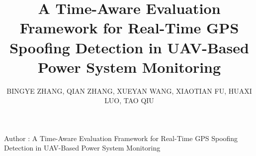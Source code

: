 \documentclass{ieeeaccess}
\begin{document}

\title{A Time-Aware Evaluation Framework for Real-Time GPS Spoofing Detection in UAV-Based Power System Monitoring}
\author{\uppercase{Bingye Zhang},
\uppercase{Qian Zhang},
\uppercase{Xueyan Wang},
\uppercase{Xiaotian Fu},
\uppercase{Huaxi Luo},
\uppercase{Tao Qiu}}

\address[1]{State Grid Taizhou Power Supply Company, No. 809, Zhongxing Road, Jiaojiang District, Taizhou 318000, China}
\address[2]{Ningbo Induschain Digital Technology Co., Ltd., No. 161 Yongshuiqiao Road, Building 2, 18–19F, Haishu District, Ningbo 315000, China}


{Author \headeretal: A Time-Aware Evaluation Framework for Real-Time GPS Spoofing Detection in UAV-Based Power System Monitoring}

\end{document}
